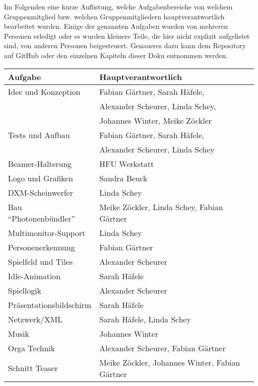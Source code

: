 
Im Folgenden eine kurze Auflistung, welche Aufgabenbereiche von welchem Gruppenmitglied bzw. welchen Gruppenmitgliedern hauptverantwortlich bearbeitet wurden. Einige der genannten Aufgaben wurden von mehreren Personen erledigt oder es wurden kleinere Teile, die hier nicht explizit aufgelistet sind, von anderen Personen beigesteuert. Genaueres dazu kann dem Repository auf GitHub oder den einzelnen Kapiteln dieser Doku entnommen werden.

\begin{center}
\begin{tabular}[hc]{|l|l|}
\hline
\textbf{Aufgabe} & \textbf{Hauptverantwortlich}\\
\hline
Idee und Konzeption& Fabian Gärtner, Sarah Häfele,\\
&Alexander Scheurer, Linda Schey,\\
&Johannes Winter, Meike Zöckler\\
Tests und Aufbau& Fabian Gärtner, Sarah Häfele,\\
&Alexander Scheurer, Linda Schey\\
Beamer-Halterung& HFU Werkstatt\\
Logo und Grafiken& Sandra Beuck\\
DXM-Scheinwerfer&Linda Schey\\
Bau \enquote{Photonenbündler}&Meike Zöckler, Linda Schey, Fabian Gärtner\\
Multimonitor-Support& Linda Schey\\
Personenerkennung& Fabian Gärtner\\
Spielfeld und Tiles& Alexander Scheurer\\
Idle-Animation& Sarah Häfele\\
Spiellogik& Alexander Scheurer\\
Präsentationsbildschirm& Sarah Häfele\\
Netzwerk/XML& Sarah Häfele, Linda Schey\\
Musik& Johannes Winter\\
Orga Technik& Alexander Scheurer, Fabian Gärtner\\
Schnitt Teaser& Meike Zöckler, Johannes Winter, Fabian Gärtner\\
\hline
\end{tabular}
\end{center}
